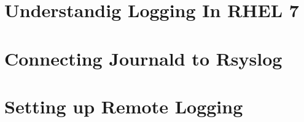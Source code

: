 
\usepackage{minted}
\usepackage{booktabs}


	
	
	\section{Understandig Logging In RHEL 7}
	\section{Connecting Journald to Rsyslog}
	\section{Setting up Remote Logging}
	



